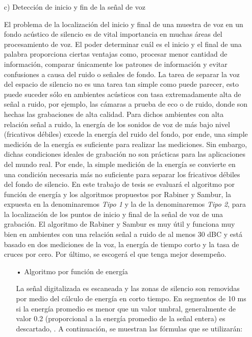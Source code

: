 \begin{enumerate}
\item[c)]Detección de inicio y fin de la señal de voz
\par
El problema de la localización del inicio y final de una muestra de voz en un fondo acústico de silencio es de vital importancia en muchas áreas del procesamiento de voz. El poder determinar cuál es el inicio y el final de una palabra proporciona ciertas ventajas como, procesar menor cantidad de información, comparar únicamente los patrones de información y evitar confusiones a causa del ruido o señales de fondo.
\vskip 0.5cm
La tarea de separar la voz del espacio de silencio no es una tarea tan simple como puede parecer, esto puede suceder sólo en ambientes acústicos con tasa extremadamente alta de señal a ruido, por ejemplo, las cámaras a prueba de eco o de ruido, donde son hechas las grabaciones de alta calidad. Para dichos ambientes con alta relación señal a ruido, la energía de los sonidos de voz de más bajo nivel (fricativos débiles) excede la energía del ruido del fondo, por ende, una simple medición de la energía es suficiente para realizar las mediciones. 
\vskip 0.5cm
Sin embargo, dichas condiciones ideales de grabación no son prácticas para las aplicaciones del mundo real. Por ende, la simple medición de la energía se convierte en una condición necesaria más no suficiente para separar los fricativos débiles del fondo de silencio.
\vskip 0.5cm
En este trabajo de tesis se evaluará el algoritmo por función de energía y los algoritmos propuestos por Rabiner y Sambur, la expuesta en \citep{unam} la denominaremos \textit{Tipo 1} y la de \citep{rabiner} la denominaremos \textit{Tipo 2}, para la localización de los puntos de inicio y final de la señal de voz de una grabación. El algoritmo de Rabiner y Sambur es muy útil y funciona muy bien en ambientes con una relación señal a ruido de al menos 30 dBC y está basado en dos mediciones de la voz, la energía de tiempo corto y la tasa de cruces por cero. Por último, se escogerá el que tenga mejor desempeño.

\begin{enumerate}
\item[•]Algoritmo por función de energía
\par
La señal digitalizada es escaneada y las zonas de silencio son removidas por medio del cálculo de energía en corto tiempo. En segmentos de 10 ms si la energía promedio es menor que un valor umbral, generalmente de valor 0.2 (proporcional a la energía promedio de la señal entera) es descartado, \cite{genoveva}. A continuación, se muestran las fórmulas que se utilizarán:


\end{enumerate}
\end{enumerate}
